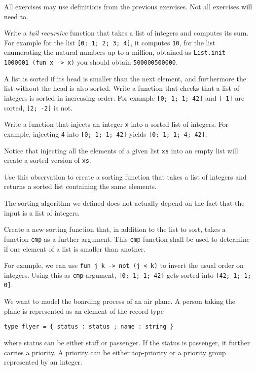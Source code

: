 \documentclass[arhiv]{../izpit}
\begin{document}


All exercises may use definitions from the previous exercises. Not all exercises will need to.

\naloga

Write a \emph{tail recursive} function that takes a list of integers and
computes its sum. For example for the list \verb|[0; 1; 2; 3; 4]|, it computes
\verb|10|, for the list enumerating the natural numbers up to a million, obtained as \verb|List.init 1000001 (fun x -> x)| you should obtain \verb|500000500000|.

\naloga

A list is sorted if its head is smaller than the next element, and furthermore the list without the head is also sorted. Write a function that checks that a list of integers is sorted in increasing order. For example \verb|[0; 1; 1; 42]| and \verb|[-1]| are sorted, \verb|[2; -2]| is not.

\naloga

Write a function that injects an integer \verb|x| into a sorted list of integers. For example, injecting \verb|4| into \verb|[0; 1; 1; 42]| yields  \verb|[0; 1; 1; 4; 42]|.

Notice that injecting all the elements of a given list \verb|xs| into an empty list will create a sorted version of \verb|xs|.

Use this observation to create a sorting function that takes a list of integers and returns a sorted list containing the same elements.

\naloga

The sorting algorithm we defined does not actually depend on the fact that the input is a list of integers.

Create a new sorting function that, in addition to the list to sort, takes a function \verb|cmp| as a further argument. This \verb|cmp| function shall be used to determine if one element of a list is smaller than another.

For example, we can use \verb|fun j k -> not (j < k)| to invert the usual order on integers. Using this as \verb|cmp| argument, \verb|[0; 1; 1; 42]| gets sorted into \verb|[42; 1; 1; 0]|.

\naloga

We want to model the boarding process of an air plane. A person taking the plane is represented as an element of the record type
%
\begin{verbatim}
type flyer = { status : status ; name : string }
\end{verbatim}
%
where status can be either staff or passenger. If the status is passenger, it further carries a priority. A priority can be either top-priority or a priority group represented by an integer.
\end{document}
